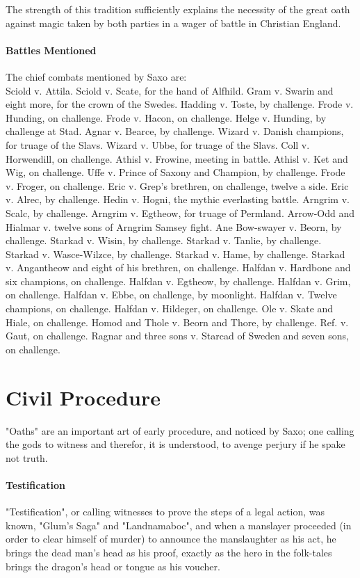 \documentclass[10pt,a4paper]{report}
\begin{document}
The strength of this tradition sufficiently explains the necessity of the great oath against magic taken by both parties in a wager of battle in Christian England.\\

\paragraph*{Battles Mentioned}
The chief combats mentioned by Saxo are: \\

Sciold v. Attila. Sciold v. Scate, for the hand of Alfhild. Gram v. Swarin and eight more, for the crown of the Swedes. Hadding v. Toste, by challenge. Frode v. Hunding, on challenge. Frode v. Hacon, on challenge. Helge v. Hunding, by challenge at Stad. Agnar v. Bearce, by challenge. Wizard v. Danish champions, for truage of the Slavs. Wizard v. Ubbe, for truage of the Slavs. Coll v. Horwendill, on challenge. Athisl v. Frowine, meeting in battle. Athisl v. Ket and Wig, on challenge. Uffe v. Prince of Saxony and Champion, by challenge. Frode v. Froger, on challenge. Eric v. Grep's brethren, on challenge, twelve a side. Eric v. Alrec, by challenge. Hedin v. Hogni, the mythic everlasting battle. Arngrim v. Scalc, by challenge. Arngrim v. Egtheow, for truage of Permland. Arrow-Odd and Hialmar v. twelve sons of Arngrim Samsey fight. Ane Bow-swayer v. Beorn, by challenge. Starkad v. Wisin, by challenge. Starkad v. Tanlie, by challenge. Starkad v. Wasce-Wilzce, by challenge. Starkad v. Hame, by challenge. Starkad v. Angantheow and eight of his brethren, on challenge. Halfdan v. Hardbone and six champions, on challenge. Halfdan v. Egtheow, by challenge. Halfdan v. Grim, on challenge. Halfdan v. Ebbe, on challenge, by moonlight. Halfdan v. Twelve champions, on challenge. Halfdan v. Hildeger, on challenge. Ole v. Skate and Hiale, on challenge. Homod and Thole v. Beorn and Thore, by challenge. Ref. v. Gaut, on challenge. Ragnar and three sons v. Starcad of Sweden and seven sons, on challenge.\\

\section{Civil Procedure}
"Oaths" are an important art of early procedure, and noticed by Saxo; one calling the gods to witness and therefor, it is understood, to avenge perjury if he spake not truth.\\

\paragraph*{Testification}
"Testification", or calling witnesses to prove the steps of a legal action, was known, "Glum's Saga" and "Landnamaboc", and when a manslayer proceeded (in order to clear himself of murder) to announce the manslaughter as his act, he brings the dead man's head as his proof, exactly as the hero in the folk-tales brings the dragon's head or tongue as his voucher.\\
\end{document}
